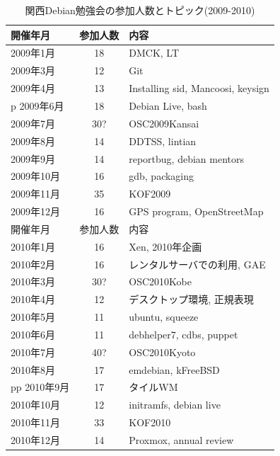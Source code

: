 \documentclass[mingoth,a4paper]{jsarticle}
\begin{document}
\begin{table}
  \begin{minipage}{.5\linewidth}
    \begin{center}
      \caption{関西Debian勉強会の参加人数とトピック(2009-2010)}
      \begin{tabular}{|l|c|p{10em}|}
        \hline
        開催年月   & 参加人数 & 内容 \\
        \hline
        2009年1月  & 18       & DMCK, LT \\
        2009年3月  & 12       & Git \\
        2009年4月  & 13       & Installing sid, Mancoosi, keysign \\
p        2009年6月  & 18       & Debian Live, bash\\
        2009年7月  & 30?      & OSC2009Kansai \\
        2009年8月  & 14       & DDTSS, lintian \\
        2009年9月  & 14       & reportbug, debian mentors\\
        2009年10月 & 16       & gdb, packaging \\
        2009年11月 & 35       & KOF2009 \\
        2009年12月 & 16       & GPS program, OpenStreetMap \\
        \hline
        \hline
        開催年月   & 参加人数 & 内容 \\
        \hline
        2010年1月  & 16       & Xen, 2010年企画 \\
        2010年2月  & 16       & レンタルサーバでの利用, GAE \\
        2010年3月  & 30?      & OSC2010Kobe \\
        2010年4月  & 12       & デスクトップ環境, 正規表現 \\
        2010年5月  & 11       & ubuntu, squeeze \\
        2010年6月  & 11       & debhelper7, cdbs, puppet \\
        2010年7月  & 40?      & OSC2010Kyoto \\
        2010年8月  & 17       & emdebian, kFreeBSD \\pp
        2010年9月  & 17       & タイルWM \\
        2010年10月 & 12       & initramfs, debian live \\
        2010年11月 & 33       & KOF2010 \\
        2010年12月 & 14       & Proxmox, annual review \\
        \hline
      \end{tabular}
    \end{center}
  \end{minipage}
\end{table}
\end{document}
